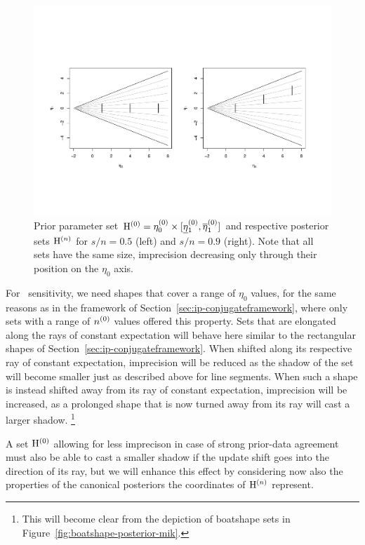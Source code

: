 \begin{figure}  %
\centering
\includegraphics[trim = 15mm 45mm 25mm 60mm, clip, width=\textwidth]{R/boatshape-vertical}%
\caption[Line segment parameter set $\EZ$ %
and respective posterior sets for $s/n=0.5$ and $s/n=0.9$.]%
{Prior parameter set $\mathrm{H}^{(0)} = \eta_0^{(0)} \times [\text{\underline{$\eta$}${}_1^{(0)}$},\overline{\eta}_1^{(0)}]$ and respective posterior sets $\mathrm{H}^{(n)}$
for $s/n=0.5$ (left) and $s/n=0.9$ (right). Note that all sets have the same size,
imprecision decreasing only through their position on the $\eta_0$ axis.}
\label{fig:boatshape-vertical}
\end{figure}

For \pdc\ sensitivity, we need shapes that cover a range of $\eta_0$ values,
for the same reasons as in the framework of Section~\ref{sec:ip-conjugateframework},
where only sets with a range of $n^{(0)}$ values offered this property.
Sets that are elongated along the rays of constant expectation
will behave here similar to the rectangular shapes of Section~\ref{sec:ip-conjugateframework}.
When shifted along its respective ray of constant expectation,
imprecision will be reduced as the shadow of the set will become smaller just as described above for line segments.
When such a shape is instead shifted away from its ray of constant expectation,
imprecision will be increased, as a prolonged shape that is now turned away from its ray 
will cast a larger shadow.%
\footnote{This will become clear from the depiction of boatshape sets in Figure~\ref{fig:boatshape-posterior-mik}.} 

A set $\EZ$ allowing for less imprecison in case of strong prior-data agreement
must also be able to cast a smaller shadow if the update shift goes into the direction of its ray,
but we will enhance this effect by considering now also the properties
of the canonical posteriors the coordinates of $\mathrm{H}^{(n)}$ represent.

